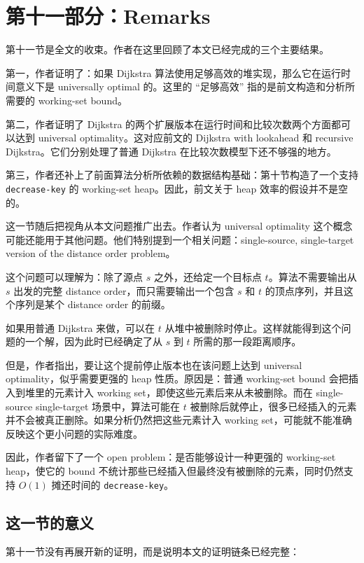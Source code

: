 \documentclass[UTF8]{ctexart}
\begin{document}
\section*{第十一部分：Remarks}

第十一节是全文的收束。作者在这里回顾了本文已经完成的三个主要结果。

第一，作者证明了：如果 Dijkstra 算法使用足够高效的堆实现，那么它在运行时间意义下是 universally optimal 的。这里的 ``足够高效'' 指的是前文构造和分析所需要的 working-set bound。

第二，作者证明了 Dijkstra 的两个扩展版本在运行时间和比较次数两个方面都可以达到 universal optimality。这对应前文的 Dijkstra with lookahead 和 recursive Dijkstra。它们分别处理了普通 Dijkstra 在比较次数模型下还不够强的地方。

第三，作者还补上了前面算法分析所依赖的数据结构基础：第十节构造了一个支持 \texttt{decrease-key} 的 working-set heap。因此，前文关于 heap 效率的假设并不是空的。

这一节随后把视角从本文问题推广出去。作者认为 universal optimality 这个概念可能还能用于其他问题。他们特别提到一个相关问题：single-source, single-target version of the distance order problem。

这个问题可以理解为：除了源点 \(s\) 之外，还给定一个目标点 \(t\)。算法不需要输出从 \(s\) 出发的完整 distance order，而只需要输出一个包含 \(s\) 和 \(t\) 的顶点序列，并且这个序列是某个 distance order 的前缀。

如果用普通 Dijkstra 来做，可以在 \(t\) 从堆中被删除时停止。这样就能得到这个问题的一个解，因为此时已经确定了从 \(s\) 到 \(t\) 所需的那一段距离顺序。

但是，作者指出，要让这个提前停止版本也在该问题上达到 universal optimality，似乎需要更强的 heap 性质。原因是：普通 working-set bound 会把插入到堆里的元素计入 working set，即使这些元素后来从未被删除。而在 single-source single-target 场景中，算法可能在 \(t\) 被删除后就停止，很多已经插入的元素并不会被真正删除。如果分析仍然把这些元素计入 working set，可能就不能准确反映这个更小问题的实际难度。

因此，作者留下了一个 open problem：是否能够设计一种更强的 working-set heap，使它的 bound 不统计那些已经插入但最终没有被删除的元素，同时仍然支持 \(O(1)\) 摊还时间的 \texttt{decrease-key}。

\subsection*{这一节的意义}

第十一节没有再展开新的证明，而是说明本文的证明链条已经完整：
\end{document}
